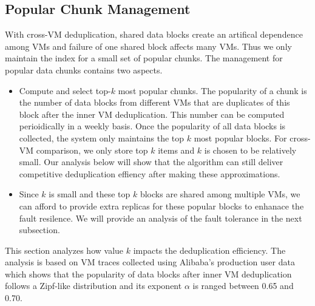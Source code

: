  \subsection{Popular Chunk Management}
With cross-VM deduplication, shared data blocks
create an artifical dependence  among VMs and failure of one shared block
affects many VMs. Thus we only maintain the index for a small set of popular chunks.
The management for popular data chunks contains two aspects.
\begin{itemize}
\item Compute and select top-$k$ most popular chunks.
The popularity of a chunk is the number  of data blocks from different VMs
that are duplicates of this block after the inner VM deduplication.
This number can be computed perioidically in a weekly basis.
Once the popularity of all data blocks is collected, the system only maintains the top $k$
most popular blocks.  For cross-VM comparison,
we only store  top $k$ items and $k$ is chosen to be relatively small.
Our analysis below will show that the algorithm can still deliver competitive
deduplication effiency after making these approximations.
\item  Since $k$ is small and these top $k$ blocks are shared among multiple VMs, 
we can afford to provide extra replicas for these popular blocks to enhanace the fault resilence.
We will provide an analysis of the fault tolerance in the next subsection.
\end{itemize} 

This section analyzes how value   $k$ impacts the deduplication efficiency.
The analysis is based on VM traces collected
using Alibaba's production user data~\cite{ieeecloud} 
which shows that the popularity of data blocks after inner VM deduplication follows 
a Zipf-like distribution\cite{zipf} and its
exponent $\alpha$ is ranged between 0.65  and  0.70.


